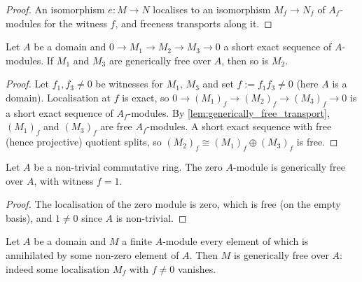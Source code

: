 \begin{proof}
\leanok
  An isomorphism \(e : M \to N\) localises to an isomorphism
  \(M_f \to N_f\) of \(A_f\)-modules for the witness \(f\), and freeness
  transports along it.
\end{proof}

\begin{lemma}\leanok
  \label{lem:generically_free_splice}
  Let \(A\) be a domain and \(0 \to M_1 \to M_2 \to M_3 \to 0\) a short exact
  sequence of \(A\)-modules.  If \(M_1\) and \(M_3\) are generically free over
  \(A\), then so is \(M_2\).
\end{lemma}

\begin{proof}
\leanok
  Let \(f_1, f_3 \ne 0\) be witnesses for \(M_1\), \(M_3\) and set
  \(f := f_1 f_3 \ne 0\) (here \(A\) is a domain).  Localisation at \(f\) is
  exact, so \(0 \to (M_1)_f \to (M_2)_f \to (M_3)_f \to 0\) is a short exact
  sequence of \(A_f\)-modules.  By
  \cref{lem:generically_free_transport}, \((M_1)_f\) and \((M_3)_f\) are free
  \(A_f\)-modules.  A short exact sequence with free (hence projective)
  quotient splits, so \((M_2)_f \cong (M_1)_f \oplus (M_3)_f\) is free.
\end{proof}

\begin{lemma}\leanok
  \label{lem:generically_free_subsingleton}
  Let \(A\) be a non-trivial commutative ring.  The zero \(A\)-module is
  generically free over \(A\), with witness \(f = 1\).
\end{lemma}

\begin{proof}
\leanok
  The localisation of the zero module is zero, which is free (on the empty
  basis), and \(1 \ne 0\) since \(A\) is non-trivial.
\end{proof}

\begin{lemma}\leanok
  \label{lem:generically_free_torsion}
  Let \(A\) be a domain and \(M\) a finite \(A\)-module every element of which
  is annihilated by some non-zero element of \(A\).  Then \(M\) is generically
  free over \(A\): indeed some localisation \(M_f\) with \(f \ne 0\) vanishes.
\end{lemma}

